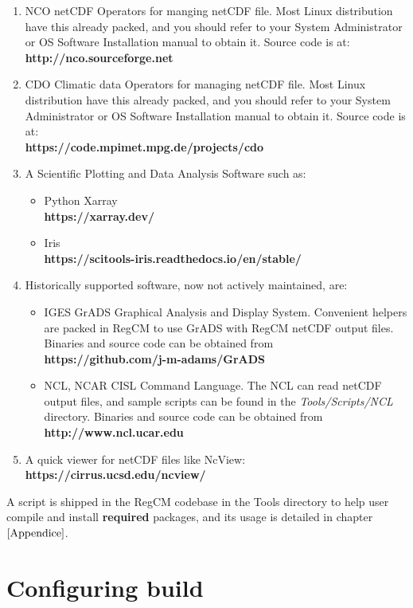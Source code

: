 \begin{enumerate}
\item NCO netCDF Operators for manging netCDF file. Most Linux distribution
have this already packed, and you should refer to your System Administrator or
OS Software Installation manual to obtain it. Source code is at: \\
{\bf http://nco.sourceforge.net}
\item CDO Climatic data Operators for managing netCDF file. Most Linux
distribution have this already packed, and you should refer to your System
Administrator or OS Software Installation manual to obtain it.
Source code is at: \\
{\bf https://code.mpimet.mpg.de/projects/cdo }
\item A Scientific Plotting and Data Analysis Software such as:
\begin{itemize}
\item Python Xarray \\ {\bf https://xarray.dev/ }
\item Iris \\ {\bf https://scitools-iris.readthedocs.io/en/stable/ }
\end{itemize}
\item Historically supported software, now not actively maintained, are:
\begin{itemize}
    \item IGES GrADS Graphical Analysis and Display System. Convenient helpers
are packed in RegCM to use GrADS with RegCM netCDF output files.
Binaries and source code can be obtained from \\
        {\bf https://github.com/j-m-adams/GrADS}
    \item NCL, NCAR CISL Command Language. The NCL can read netCDF output files, and sample scripts can be found in the {\em Tools/Scripts/NCL} directory.
Binaries and source code can be obtained from \\
{\bf http://www.ncl.ucar.edu}
\end{itemize}
\item A quick viewer for netCDF files like NcView: \\
{\bf https://cirrus.ucsd.edu/ncview/}
\end{enumerate}

A script is shipped in the RegCM codebase in the Tools directory to help
user compile and install {\bf required} packages, and its usage is detailed in
chapter $\ref{Appendice}$.

\section{Configuring build}

